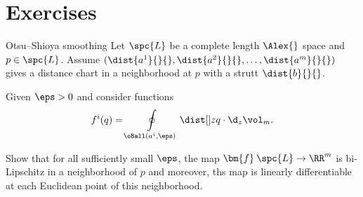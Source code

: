 \section{Exercises}

\begin{thm}{Otsu--Shioya smoothing}
Let $\spc{L}$ be a complete length $\Alex{}$ space and $p\in\spc{L}$.
Assume $(\dist{a^1}{}{},\dist{a^2}{}{},\dots,\dist{a^m}{}{})$
gives a distance chart 
in a neighborhood at $p$ with a strutt $\dist{b}{}{}$.

Given $\eps>0$ and consider functions 
\[f^i(q)=\oint\limits_{\oBall(a^i,\eps)}\dist[{{}}]{z}{q}{}\cdot\d_z\vol_m.\]

Show that for all sufficiently small $\eps$,
the map $\bm{f}\:\spc{L}\to\RR^m$ is bi-Lipschitz in a neighborhood of $p$ and moreover, ths map is linearly differentiable at each Euclidean point of this neighborhood.
\end{thm}










